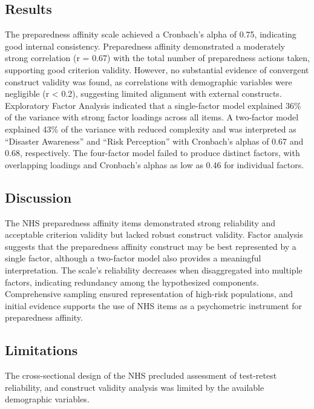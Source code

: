 \documentclass[
  letterpaper,
  DIV=11,
  numbers=noendperiod]{scrartcl}
\begin{document}
\subsection{Results}\label{results}

The preparedness affinity scale achieved a Cronbach's alpha of 0.75,
indicating good internal consistency. Preparedness affinity demonstrated
a moderately strong correlation (r = 0.67) with the total number of
preparedness actions taken, supporting good criterion validity. However,
no substantial evidence of convergent construct validity was found, as
correlations with demographic variables were negligible (r \textless{}
0.2), suggesting limited alignment with external constructs. Exploratory
Factor Analysis indicated that a single-factor model explained 36\% of
the variance with strong factor loadings across all items. A two-factor
model explained 43\% of the variance with reduced complexity and was
interpreted as ``Disaster Awareness'' and ``Risk Perception'' with
Cronbach's alphas of 0.67 and 0.68, respectively. The four-factor model
failed to produce distinct factors, with overlapping loadings and
Cronbach's alphas as low as 0.46 for individual factors.

\subsection{Discussion}\label{discussion}

The NHS preparedness affinity items demonstrated strong reliability and
acceptable criterion validity but lacked robust construct validity.
Factor analysis suggests that the preparedness affinity construct may be
best represented by a single factor, although a two-factor model also
provides a meaningful interpretation. The scale's reliability decreases
when disaggregated into multiple factors, indicating redundancy among
the hypothesized components. Comprehensive sampling ensured
representation of high-risk populations, and initial evidence supports
the use of NHS items as a psychometric instrument for preparedness
affinity.

\subsection{Limitations}\label{limitations}

The cross-sectional design of the NHS precluded assessment of
test-retest reliability, and construct validity analysis was limited by
the available demographic variables.
\end{document}

